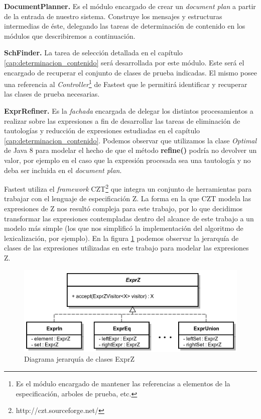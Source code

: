 \bigskip
\noindent
\textbf{DocumentPlanner.} Es el módulo encargado de crear un \textit{document plan} a partir de la entrada de nuestro sistema. Construye los mensajes y estructuras intermedias de éste, delegando las tareas de determinación de contenido en los módulos que describiremos a continuación.

\bigskip
\noindent
\textbf{SchFinder.} La tarea de selección detallada en el capítulo \ref{cap:determinacion_contenido} será desarrollada por este módulo. Este será el encargado de recuperar el conjunto de clases de prueba indicadas. El mismo posee una referencia al \emph{Controller}\footnote{Es el módulo encargado de mantener las referencias a elementos de la especificación, arboles de prueba, etc.} de Fastest que le permitirá identificar y recuperar las clases de prueba necesarias. 


\bigskip
\noindent
\textbf{ExprRefiner.} Es la \textit{fachada} \cite{gof} encargada de delegar los distintos procesamientos a realizar sobre las expresiones a fin de desarrollar las tareas de eliminación de tautologías y reducción de expresiones estudiadas en el capítulo \ref{cap:determinacion_contenido}. Podemos observar que utilizamos la clase \emph{Optimal} de Java 8 para modelar el hecho de que el método \textbf{refine()} podría no devolver un valor, por ejemplo en el caso que la expresión procesada sea una tautología y no deba ser incluida en el \textit{document plan}.

\bigskip
Fastest utiliza el \textit{framework} CZT\footnote{http://czt.sourceforge.net/} que integra un conjunto de herramientas para trabajar con el lenguaje de especificación Z. La forma en la que CZT modela las expresiones de Z nos resultó compleja para este trabajo, por lo que decidimos transformar las expresiones contempladas dentro del alcance de este trabajo a un modelo más simple (los que nos simplificó la implementación del algoritmo de lexicalización, por ejemplo). En la figura \ref{fig:imp_exprz} podemos observar la jerarquía de clases de las expresiones utilizadas en este trabajo para modelar las expresiones Z. 

\begin{figure}[H]
  	\centering
	\includegraphics[scale=0.31]{img/exprz_imp.png}
	\caption{Diagrama jerarquía de clases ExprZ}
  	\label{fig:imp_exprz}
\end{figure}

